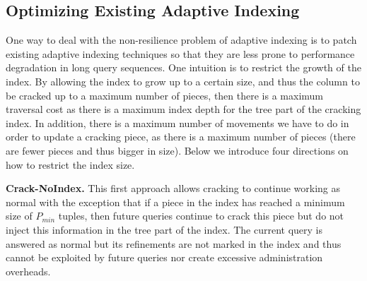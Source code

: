 \begin{figure}[t]
{\label{F:lazycrake}
}
\hfill
\hspace{-6.5em}%
\end{figure}

\subsection{Optimizing Existing Adaptive Indexing}
\label{sec:simple}

One way to deal with the non-resilience  problem of adaptive indexing is to patch existing 
adaptive indexing techniques so that they are less prone to performance degradation in long 
query sequences. One intuition is to restrict the growth of the index. 
By allowing the index to grow up to a certain size, and thus the column to be cracked up to a maximum number of pieces,
then there is a maximum traversal cost
as there is a maximum index depth for the tree part of the cracking index.
In addition, there is a maximum number of movements we have to do in order to 
update a cracking piece, as there is a maximum number of pieces (there are fewer pieces and thus bigger in size).
Below we introduce four directions on how to restrict the index size. 

\textbf{Crack-NoIndex.} This first approach allows cracking to continue working as normal with the exception 
that if a piece in the index  has reached a minimum size of $P_{min}$ tuples, then future queries continue to crack this
piece but do not inject this information in the tree part of the index.
The current query is answered as normal  but its refinements are not marked in the index and thus
cannot be exploited by future queries nor create excessive administration overheads.  

